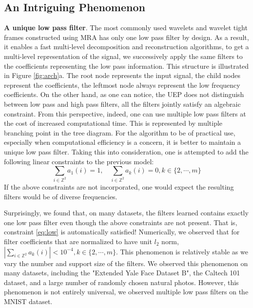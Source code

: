 \documentclass[a4paper]{article}
\begin{document}
\subsection{An Intriguing Phenomenon}
\textbf{A unique low pass filter}. The most commonly used wavelets and wavelet tight frames constructed using MRA has only one low pass filter by design. As a result, it enables a fast multi-level decomposition and reconstruction algorithms, to get a multi-level representation of the signal, we successively apply the same filters to the coefficients representing the low pass information. This structure is illustrated in Figure \ref{fig:arch}a. The root node represents the input signal, the child nodes represent the coefficients, the leftmost node always represent the low frequency coefficients. On the other hand, as one can notice, the UEP does not distinguish between low pass and high pass filters, all the filters jointly satisfy an algebraic constraint. From this perspective, indeed, one can use multiple low pass filters at the cost of increased computational time. This is represented by multiple branching point in the tree diagram. For the algorithm to be of practical use, especially when computational efficiency is a concern, it is better to maintain a unique low pass filter. Taking this into consideration, one is attempted to add the following linear constraints to the previous model:
\begin{equation}
\label{eq:low}
\sum_{i\in\mathbb{Z}^2} a_1(i)=1,\quad \sum_{i\in \mathbb{Z}^2} a_k(i)=0, k\in\{2,\cdots,m\}
\end{equation}
If the above constraints are not incorporated, one would expect the resulting filters would be of diverse frequencies.

Surprisingly, we found that, on many datasets, the filters learned contains exactly one low pass filter even though the above constraints are not present. That is, constraint \eqref{eq:low} is automatically satisfied!  Numerically, we observed that for filter coefficients that are normalized to have unit $l_2$ norm, $ |\sum_{i\in \mathbb{Z}^2} a_k(i)| < 10^{-4}, k\in\{2,\cdots,m\}$. This phenomenon is relatively stable as we vary the number and support size of the filters. We observed this phenomenon on many datasets, including the "Extended Yale Face Dataset B"\cite{GeBeKr01}, the Caltech 101 dataset\cite{fei2007learning}, and a large number of randomly chosen natural photos. However, this phenomenon is not entirely universal, we observed multiple low pass filters on the MNIST dataset\cite{lecun1998gradient}. 
\end{document}
